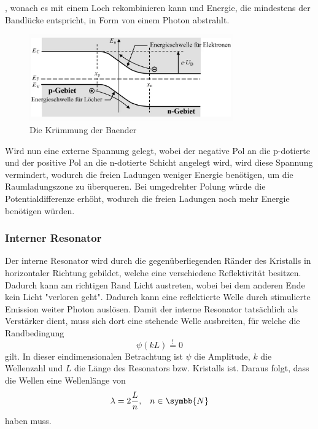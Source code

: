 , wonach es mit einem Loch rekombinieren kann und Energie, die mindestens der Bandlücke entspricht, in Form von einem Photon abstrahlt.
\begin{figure}
    \centering
    \includegraphics[width = 0.78\textwidth]{pictures/kruemmung.png}
    \caption{Die Krümmung der Baender\cite{kruemmung}}
    \label{pic:kruemmung}
\end{figure}
Wird nun eine externe Spannung gelegt, wobei der negative Pol an die p-dotierte und der positive Pol an die n-dotierte Schicht angelegt wird, wird diese Spannung vermindert,
wodurch die freien Ladungen weniger Energie benötigen, um die Raumladungszone zu überqueren.
Bei umgedrehter Polung würde die Potentialdifferenze erhöht, wodurch die freien Ladungen noch mehr Energie benötigen würden.
\subsubsection{Interner Resonator}
\label{subsubsec:internerResonator}
Der interne Resonator wird durch die gegenüberliegenden Ränder des Kristalls in horizontaler Richtung gebildet, welche eine verschiedene Reflektivität besitzen.
Dadurch kann am richtigen Rand Licht austreten, wobei bei dem anderen Ende kein Licht "verloren geht".
Dadurch kann eine reflektierte Welle durch stimulierte Emission weiter Photon auslösen.
Damit der interne Resonator tatsächlich als Verstärker dient,
muss sich dort eine stehende Welle ausbreiten, für welche die Randbedingung 
\begin{equation}
    \psi \left (kL \right ) \overset{!}{=} 0    \label{eqn:psi}
\end{equation}
gilt. In dieser eindimensionalen Betrachtung ist $\psi$ die Amplitude, $k$ die Wellenzahl und $L$ die Länge des Resonators bzw. Kristalls ist. 
Daraus folgt, dass die Wellen eine Wellenlänge von 
\begin{equation}
    \lambda = 2\frac{L}{n}, \; \; \; n \in \symbb{N} \label{eqn:lambda}
\end{equation}
haben muss.
